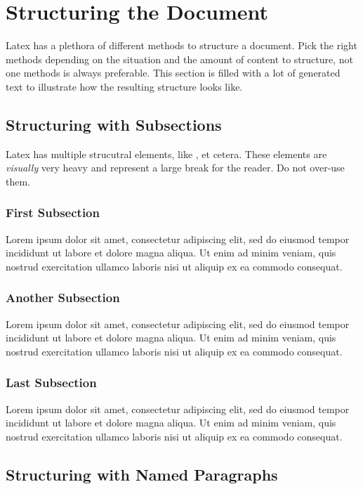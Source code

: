 \section{Structuring the Document}

Latex has a plethora of different methods to structure a document.
Pick the right methods depending on the situation and the amount of content to structure, not one methods is always preferable.
This section is filled with a lot of generated text to illustrate how the resulting structure looks like.

\subsection{Structuring with Subsections}

Latex has multiple strucutral elements, like ,  et cetera.
These elements are \emph{visually} very heavy and represent a large break for the reader.
Do not over-use them.

\subsubsection{First Subsection}
Lorem ipsum dolor sit amet, consectetur adipiscing elit, sed do eiusmod tempor incididunt ut labore et dolore magna aliqua. Ut enim ad minim veniam, quis nostrud exercitation ullamco laboris nisi ut aliquip ex ea commodo consequat.

\subsubsection{Another Subsection}
Lorem ipsum dolor sit amet, consectetur adipiscing elit, sed do eiusmod tempor incididunt ut labore et dolore magna aliqua. Ut enim ad minim veniam, quis nostrud exercitation ullamco laboris nisi ut aliquip ex ea commodo consequat.

\subsubsection{Last Subsection}
Lorem ipsum dolor sit amet, consectetur adipiscing elit, sed do eiusmod tempor incididunt ut labore et dolore magna aliqua. Ut enim ad minim veniam, quis nostrud exercitation ullamco laboris nisi ut aliquip ex ea commodo consequat.

\subsection{Structuring with Named Paragraphs}

